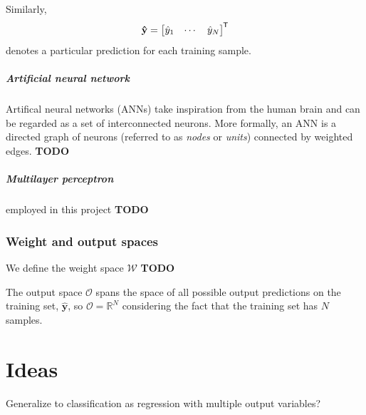 \documentclass[oneside]{book}
\renewcommand\vec{\mathbf}
\newcommand*{\tran}{^{\mkern-1.5mu\mathsf{T}}}
\newcommand{\todo}{{\color{red} \textbf{TODO} }}
\begin{document}
Similarly,
\begin{equation}
    \label{eq:sup_learn_prediction}
    \vec{\hat{y}} = \begin{bmatrix}
        \hat{y}_1 & \cdots & \hat{y}_N
    \end{bmatrix}\tran
\end{equation}
denotes a particular prediction for each training sample.

\paragraph{Artificial neural network}
Artifical neural networks (ANNs) take inspiration from the human brain and can be regarded as a set of interconnected neurons. 
More formally, an ANN is a directed graph of neurons (referred to as \textit{nodes} or \textit{units}) connected by weighted edges.
\todo

\paragraph{Multilayer perceptron}
employed in this project
\todo

\subsection{Weight and output spaces}
We define the weight space $\mathcal{W}$ \todo

The output space $\mathcal{O}$ spans the space of all possible output predictions on the training set, $\vec{\hat{y}}$, so $\mathcal{O}=\mathbb{R}^N$ considering the fact that the training set has $N$ samples.

\chapter*{Ideas}
Generalize to classification as regression with multiple output variables?
\end{document}
